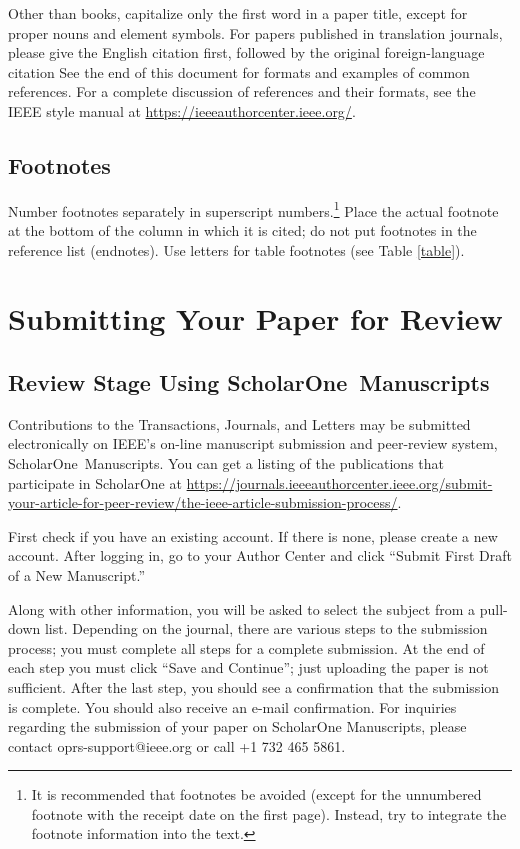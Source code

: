 \documentclass{ieeeojies}
\begin{document}
Other than books, capitalize only the first word in a paper title, except
for proper nouns and element symbols. For papers published in translation
journals, please give the English citation first, followed by the original
foreign-language citation See the end of this document for formats and
examples of common references. For a complete discussion of references and
their formats, see the IEEE style manual at
\underline{https://ieeeauthorcenter.ieee.org/}.

\subsection{Footnotes}
Number footnotes separately in superscript numbers.\footnote{It is recommended that footnotes be avoided (except for
the unnumbered footnote with the receipt date on the first page). Instead,
try to integrate the footnote information into the text.} Place the actual
footnote at the bottom of the column in which it is cited; do not put
footnotes in the reference list (endnotes). Use letters for table footnotes
(see Table \ref{table}).

\section{Submitting Your Paper for Review}

\subsection{Review Stage Using ScholarOne\textregistered\ Manuscripts}
Contributions to the Transactions, Journals, and Letters may be submitted
electronically on IEEE's on-line manuscript submission and peer-review
system, ScholarOne\textregistered\ Manuscripts. You can get a listing of the
publications that participate in ScholarOne at
\underline{https://journals.ieeeauthorcenter.ieee.org/submit-your-article-}\break\underline{for-peer-review/the-ieee-article-submission-process/}.

First check if you have an existing account. If there is none, please create
a new account. After logging in, go to your Author Center and click ``Submit
First Draft of a New Manuscript.''

Along with other information, you will be asked to select the subject from a
pull-down list. Depending on the journal, there are various steps to the
submission process; you must complete all steps for a complete submission.
At the end of each step you must click ``Save and Continue''; just uploading
the paper is not sufficient. After the last step, you should see a
confirmation that the submission is complete. You should also receive an
e-mail confirmation. For inquiries regarding the submission of your paper on
ScholarOne Manuscripts, please contact oprs-support@ieee.org or call +1 732
465 5861.
\end{document}
